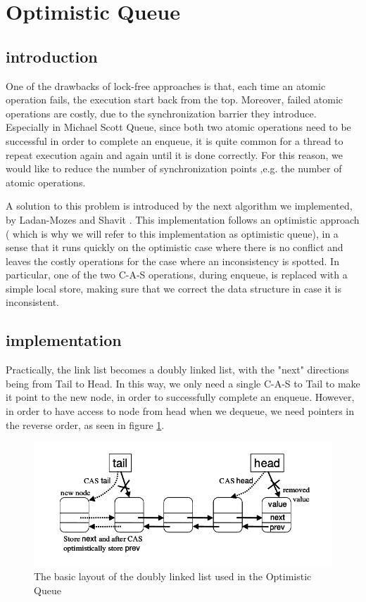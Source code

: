 


\section{Optimistic Queue}

\subsection{introduction}
One of the drawbacks of lock-free approaches is that, each time an atomic operation fails, the execution start back from the top. Moreover, failed atomic operations are costly, due to the synchronization barrier they introduce. Especially in Michael Scott Queue, since both two atomic operations need to be successful in order to complete an enqueue, it is quite common for a thread to repeat execution again and again until it is done correctly. For this reason, we would like to reduce the number of synchronization points ,e.g. the number of atomic operations.

A solution to this problem is introduced by the next algorithm we implemented, by Ladan-Mozes and Shavit \cite{optimistic}. This implementation follows an optimistic approach ( which is why we will refer to this implementation as optimistic queue), in a sense that it runs quickly on the optimistic case where there is no conflict and leaves the costly operations for the case where an inconsistency is spotted. In particular, one of the two C-A-S operations, during enqueue, is replaced with a simple local store, making sure that we correct the data structure in case it is inconsistent.

\subsection{implementation}
Practically, the link list becomes a doubly linked list, with the "next" directions being from Tail to Head. In this way, we only need a single C-A-S to Tail to make it point to the new node, in order to successfully complete an enqueue. However, in order to have access to node from head when we dequeue, we need pointers in the reverse order, as seen in figure \ref{optimistic_struct}.

\begin{figure}
 \centering
  \includegraphics[scale=0.6]{optimistic_struct.png}
 \caption{ The basic layout of the doubly linked list used in the Optimistic Queue}
\label{optimistic_struct}
\end{figure}

